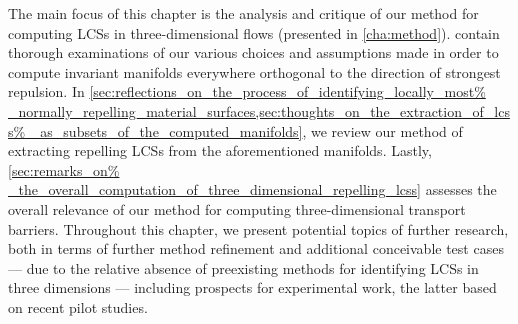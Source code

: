 The main focus of this chapter is the analysis and critique of our method for
computing LCSs in three-dimensional flows (presented in \cref{cha:method}).
 contain thorough
examinations of our various choices and assumptions made in order to compute
invariant manifolds everywhere orthogonal to the direction of strongest
repulsion. In \cref{sec:reflections_on_the_process_of_identifying_locally_most%
_normally_repelling_material_surfaces,sec:thoughts_on_the_extraction_of_lcss%
_as_subsets_of_the_computed_manifolds}, we review our method of extracting
repelling LCSs from the aforementioned manifolds. Lastly, \cref{sec:remarks_on%
_the_overall_computation_of_three_dimensional_repelling_lcss} assesses
the overall relevance of our method for computing three-dimensional transport
barriers. Throughout this chapter, we present potential topics of further
research, both in terms of further method refinement and additional conceivable
test cases --- due to the relative absence of preexisting methods for
identifying LCSs in three dimensions --- including prospects for experimental
work, the latter based on recent pilot studies.
